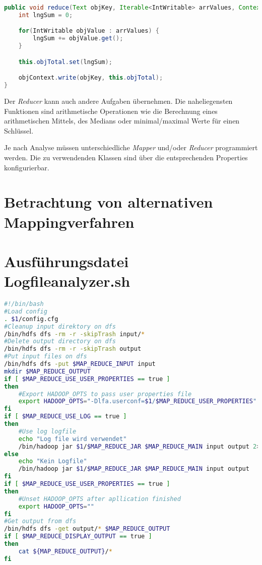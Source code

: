\begin{lstlisting}[language=Java,caption=Methode \textit{reduce()} der Klasse \textit{CountReducer},label=lst:MethodeReduce]
public void reduce(Text objKey, Iterable<IntWritable> arrValues, Context objContext) throws IOException, InterruptedException {
	int lngSum = 0;

	for(IntWritable objValue : arrValues) {
		lngSum += objValue.get();
	}

	this.objTotal.set(lngSum);

	objContext.write(objKey, this.objTotal);
}
\end{lstlisting}

Der \textit{Reducer} kann auch andere Aufgaben übernehmen. Die naheliegensten Funktionen sind arithmetische Operationen wie die Berechnung eines arithmetischen Mittels, des Medians oder minimal/maximal Werte für einen Schlüssel.

Je nach Analyse müssen unterschiedliche \textit{Mapper} und/oder \textit{Reducer} programmiert werden. Die zu verwendenden Klassen sind über die entsprechenden Properties konfigurierbar.

\section{Betrachtung von alternativen Mappingverfahren}


\section{Ausführungsdatei Logfileanalyzer.sh}\label{sec:Ausführungsdatei}


\begin{lstlisting}[language=Bash,caption=Ausführungsdatei Logfileanalyzer.sh,label=lis:Logfileanalyzer.sh]
#!/bin/bash
#Load config
. $1/config.cfg
#Cleanup input direktory on dfs
/bin/hdfs dfs -rm -r -skipTrash input/*
#Delete output directory on dfs
/bin/hdfs dfs -rm -r -skipTrash output
#Put input files on dfs
/bin/hdfs dfs -put $MAP_REDUCE_INPUT input
mkdir $MAP_REDUCE_OUTPUT
if [ $MAP_REDUCE_USE_USER_PROPERTIES == true ]
then
	#Export HADOOP_OPTS to pass user properties file
	export HADOOP_OPTS="-Dlfa.userconf=$1/$MAP_REDUCE_USER_PROPERTIES"
fi
if [ $MAP_REDUCE_USE_LOG == true ]
then
	#Use log logfile
	echo "Log file wird verwendet"
	/bin/hadoop jar $1/$MAP_REDUCE_JAR $MAP_REDUCE_MAIN input output 2> $MAP_REDUCE_LOGFILE
else
	echo "Kein Logfile"
	/bin/hadoop jar $1/$MAP_REDUCE_JAR $MAP_REDUCE_MAIN input output
fi
if [ $MAP_REDUCE_USE_USER_PROPERTIES == true ]
then
	#Unset HADOOP_OPTS after apllication finished
	export HADOOP_OPTS=""
fi
#Get output from dfs
/bin/hdfs dfs -get output/* $MAP_REDUCE_OUTPUT
if [ $MAP_REDUCE_DISPLAY_OUTPUT == true ]
then
	cat ${MAP_REDUCE_OUTPUT}/*
fi
\end{lstlisting}

